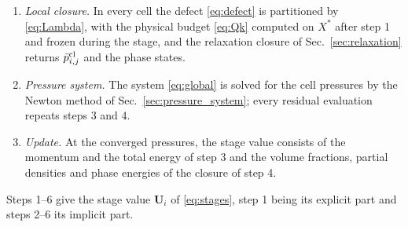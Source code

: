 \begin{enumerate}
\[
\begin{aligned}
&X^{\rm tr}_{i,j}=X^*_{i,j}-r_x\,\delta_x\big[I[X]\big]_{i,j}-r_y\,\delta_y\big[I[X]\big]_{i,j},\qquad X\in\{m_k,\varepsilon_k\},\\
&s_{i,j}=r_x\,\delta_x[u_f]_{i,j}+r_y\,\delta_y[v_f]_{i,j},\qquad \alpha^{\rm tr}_{k,i,j}=\alpha^*_{k,i,j}(1-s_{i,j}),\\
&\rho^{\rm new}_{i,j}=\textstyle\sum_km^{\rm tr}_{k,i,j}.
\end{aligned}
\]
Let $u_\perp$ be the normal face velocity, $u_f$ on $x$-faces and $v_f$ on $y$-faces, and $u_{\parallel,L}$, $u_{\parallel,R}$ the tangential velocities
of $X^*$ in the two cells of the face, $v^*$ on $x$-faces and $u^*$ on $y$-faces. The momentum is advanced with the face
pressure and the incremental momentum flux, normal and tangential,
\[
\begin{aligned}
(\rho u)^{\rm new}_{i,j}&=(\rho u)^*_{i,j}-r_x\,\delta_x\big[p_f+u_\perp\hat M_f\big]_{i,j}-r_y\,\delta_y\big[u_{\parallel,L}\hat M^L_f+u_{\parallel,R}\hat M^R_f\big]_{i,j},\\
(\rho v)^{\rm new}_{i,j}&=(\rho v)^*_{i,j}-r_x\,\delta_x\big[u_{\parallel,L}\hat M^L_f+u_{\parallel,R}\hat M^R_f\big]_{i,j}-r_y\,\delta_y\big[p_f+u_\perp\hat M_f\big]_{i,j},
\end{aligned}
\]
and the total energy with the energy flux
\[
\begin{gathered}
F^I_f[E]=\textstyle\sum_kI_f[\varepsilon_k]+\tfrac12u_\perp^2\hat M_f+\tfrac12\big(u_{\parallel,L}^2\hat M^L_f+u_{\parallel,R}^2\hat M^R_f\big)+p_fu_\perp ,\\
E^{\rm new}_{i,j}=E^*_{i,j}-r_x\,\delta_x\big[F^I[E]\big]_{i,j}-r_y\,\delta_y\big[F^I[E]\big]_{i,j}.
\end{gathered}
\]
In each cell the conservative mixture internal energy is $(\rho e)^C=E^{\rm new}-|(\rho\mathbf u)^{\rm new}|^2/(2\rho^{\rm new})$.
\item \emph{Local closure.} In every cell the defect \eqref{eq:defect} is partitioned by \eqref{eq:Lambda}, with the
physical budget \eqref{eq:Qk} computed on $X^*$ after step 1 and frozen during the stage, and the relaxation closure of
Sec.~\ref{sec:relaxation} returns $\bar p^{\rm cl}_{i,j}$ and the phase states.
\item \emph{Pressure system.} The system \eqref{eq:global} is solved for the cell pressures by the Newton method of
Sec.~\ref{sec:pressure_system}; every residual evaluation repeats steps 3 and 4.
\item \emph{Update.} At the converged pressures, the stage value consists of the momentum and the total energy of
step 3 and the volume fractions, partial densities and phase energies of the closure of step 4.
\end{enumerate}
Steps 1--6 give the stage value $\mathbf U_i$ of \eqref{eq:stages}, step 1 being its explicit part and steps 2--6 its implicit part.
